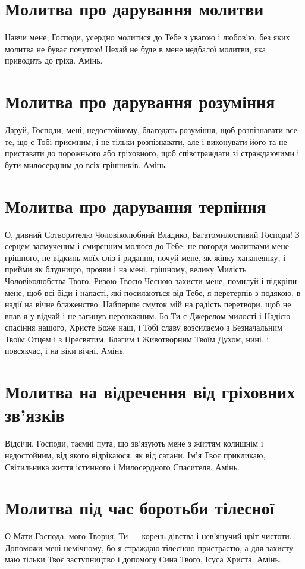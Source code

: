 \documentclass[chapters.tex]{subfiles}
\begin{document}
\section{Молитва про дарування молитви}
Навчи мене, Господи, усердно молитися до Тебе з увагою і любов’ю, без яких молитва не буває почутою! Нехай не буде в мене недбалої молитви, яка приводить до гріха. Амінь.

\section{Молитва про дарування розуміння}
Даруй, Господи, мені, недостойному, благодать розуміння, щоб розпізнавати все те, що є Тобі приємним, і не тільки розпізнавати, але і виконувати його та не приставати до порожнього або гріховного, щоб співстраждати зі страждаючими і бути милосердним до всіх грішників. Амінь.

\section{Молитва про дарування терпіння}
О, дивний Сотворителю Чоловіколюбний Владико, Багатомилостивий Господи! З серцем засмученим і смиренним молюся до Тебе: не погорди молитвами мене грішного, не відкинь моїх сліз і ридання, почуй мене, як жінку-хананеянку, і прийми як блудницю, прояви і на мені, грішному, велику Милість Чоловіколюбства Твого. Ризою Твоєю Чесною захисти мене, помилуй і підкріпи мене, щоб всі біди і напасті, які посилаються від Тебе, я перетерпів з подякою, в надії на вічне блаженство. Найперше смуток мій на радість перетвори, щоб не впав я у відчай і не загинув нерозкаяним. Бо Ти є Джерелом милості і Надією спасіння нашого, Христе Боже наш, і Тобі славу возсилаємо з Безначальним Твоїм Отцем і з Пресвятим, Благим і Животворним Твоїм Духом, нині, і повсякчас, і на віки вічні. Амінь.

\section{Молитва на відречення від гріховних зв’язків}
Відсічи, Господи, таємні пута, що зв’язують мене з життям колишнім і недостойним, від якого відрікаюся, як від сатани. Ім’я Твоє прикликаю, Світильника життя істинного і Милосердного Спасителя. Амінь.

\section{Молитва під час боротьби тілесної}
О Мати Господа, мого Творця, Ти — корень дівства і нев’янучий цвіт чистоти. Допоможи мені немічному, бо я страждаю тілесною пристрастю, а для захисту маю тільки Твоє заступництво і допомогу Сина Твого, Ісуса Христа. Амінь.
\end{document}
